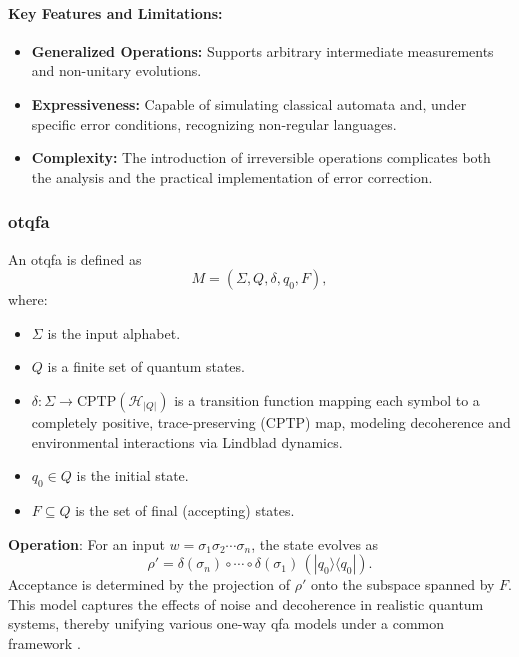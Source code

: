 \paragraph{Key Features and Limitations:}
\begin{itemize}
    \item \textbf{Generalized Operations:} Supports arbitrary intermediate measurements and non-unitary evolutions.
    \item \textbf{Expressiveness:} Capable of simulating classical automata and, under specific error conditions, recognizing non-regular languages.
    \item \textbf{Complexity:} The introduction of irreversible operations complicates both the analysis and the practical implementation of error correction.
\end{itemize}

\subsubsection{\acrfull{otqfa}}
\label{sssec:ot-qfa}
\begin{definition}
An \gls{otqfa} is defined as 
\[
M = (\Sigma, Q, \delta, q_0, F),
\]
where:
\begin{itemize}
    \item \( \Sigma \) is the input alphabet.
    \item \( Q \) is a finite set of quantum states.
    \item \( \delta: \Sigma \to \text{CPTP}(\mathcal{H}_{|Q|}) \) is a transition function mapping each symbol to a completely positive, trace-preserving (CPTP) map, modeling decoherence and environmental interactions via Lindblad dynamics.
    \item \( q_0 \in Q \) is the initial state.
    \item \( F \subseteq Q \) is the set of final (accepting) states.
\end{itemize}
\end{definition}

\textbf{Operation}:  
For an input \( w = \sigma_1\sigma_2\cdots\sigma_n \), the state evolves as
\[
\rho' = \delta(\sigma_n) \circ \cdots \circ \delta(\sigma_1) \, (|q_0\rangle\langle q_0|).
\]
Acceptance is determined by the projection of \( \rho' \) onto the subspace spanned by \( F \). This model captures the effects of noise and decoherence in realistic quantum systems, thereby unifying various one-way qfa models under a common framework \cite{hirvensalo2012quantum}.

